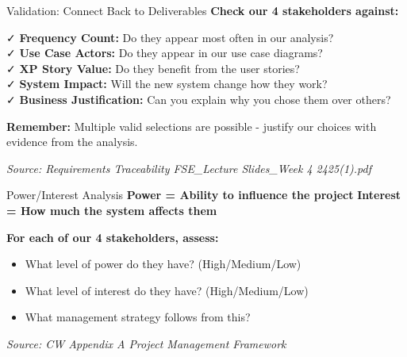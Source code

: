 \documentclass[
  ignorenonframetext,
]{beamer}
\providecommand{\tightlist}{%
  \setlength{\itemsep}{0pt}\setlength{\parskip}{0pt}}
\begin{document}
\begin{frame}{Validation: Connect Back to Deliverables}
\label{validation-connect-back-to-deliverables}
\textbf{Check our 4 stakeholders against:}

✓ \textbf{Frequency Count:} Do they appear most often in our analysis?\\
✓ \textbf{Use Case Actors:} Do they appear in our use case diagrams?\\
✓ \textbf{XP Story Value:} Do they benefit from the user stories?\\
✓ \textbf{System Impact:} Will the new system change how they work?\\
✓ \textbf{Business Justification:} Can you explain why you chose them
over others?

\textbf{Remember:} Multiple valid selections are possible - justify our
choices with evidence from the analysis.

\emph{Source: Requirements Traceability \textbar{} FSE\_Lecture
Slides\_Week 4 2425(1).pdf}
\end{frame}

\begin{frame}{Power/Interest Analysis}
\label{powerinterest-analysis}
\textbf{Power = Ability to influence the project} \textbf{Interest = How
much the system affects them}

\textbf{For each of our 4 stakeholders, assess:}

\begin{itemize}
\tightlist
\item
  What level of power do they have? (High/Medium/Low)
\item
  What level of interest do they have? (High/Medium/Low)
\item
  What management strategy follows from this?
\end{itemize}

\emph{Source: CW Appendix A \textbar{} Project Management Framework}
\end{frame}
\end{document}
